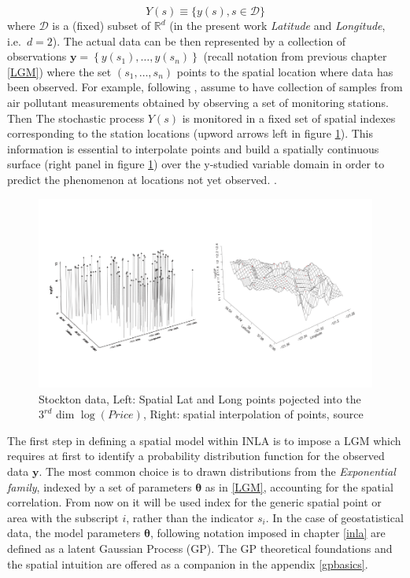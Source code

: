 \documentclass[
  12pt,
  a4paper,
  oneside]{book}
\theoremstyle{definition}
\theoremstyle{definition}
\theoremstyle{definition}
\theoremstyle{remark}
\begin{document}
\[
Y(s) \equiv\{y(s), s \in \mathscr{D}\}
\]
where \(\mathscr{D}\) is a (fixed) subset of \(\mathbb{R}^{d}\) (in the present work \emph{Latitude} and \emph{Longitude}, i.e.~\(d=2\)). The actual data can be then represented by a collection of observations \(\boldsymbol{\mathbf{y}}=\left\{y\left(s_{1}\right), \ldots, y\left(s_{n}\right)\right\}\) (recall notation from previous chapter \ref{LGM}) where the set \(\left(s_{1}, \ldots, s_{n}\right)\) points to the spatial location where data has been observed. For example, following \citet{Cameletti2012}, assume to have collection of samples from air pollutant measurements obtained by observing a set of monitoring stations. Then The stochastic process \(Y(s)\) is monitored in a fixed set of spatial indexes corresponding to the station locations (upword arrows left in figure \ref{fig:prdproc}). This information is essential to interpolate points and build a spatially continuous surface (right panel in figure \ref{fig:prdproc}) over the y-studied variable domain in order to predict the phenomenon at locations not yet observed. \citep{LecturePaci}.

\begin{figure}
\centering
\includegraphics{images/prdprocess.png}
\caption{\label{fig:prdproc}Stockton data, Left: Spatial Lat and Long points pojected into the \(3^{rd}\) dim \(\log(Price)\), Right: spatial interpolation of points, source \citet{Blangiardo-Cameletti}}
\end{figure}

The first step in defining a spatial model within INLA is to impose a LGM which requires at first to identify a probability distribution function for the observed data \(\boldsymbol{\mathbf{y}}\). The most common choice is to drawn distributions from the \emph{Exponential family}, indexed by a set of parameters \(\boldsymbol\theta\) as in \ref{LGM}, accounting for the spatial correlation. From now on it will be used index for the generic spatial point or area with the subscript \(i\), rather than the indicator \(s_i\).
In the case of geostatistical data, the model parameters \(\boldsymbol\theta\), following notation imposed in chapter \ref{inla} are defined as a latent Gaussian Process (GP). The GP theoretical foundations and the spatial intuition are offered as a companion in the appendix \ref{gpbasics}.
\end{document}
